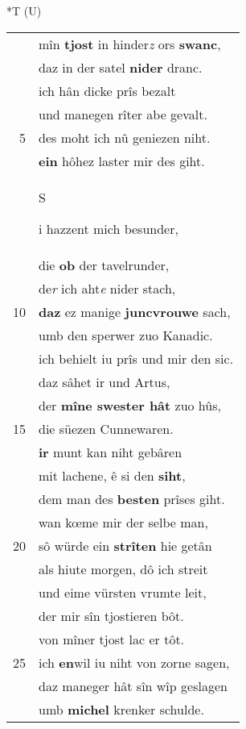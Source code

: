 \documentclass[8pt,a4paper,notitlepage]{article}
\begin{document}
\begin{table}[ht]
\begin{minipage}[t]{0.5\linewidth}
\end{minipage}
\hspace{0.5cm}
\begin{minipage}[t]{0.5\linewidth}
\small
\begin{center}*T (U)
\end{center}
\begin{tabular}{rl}
 & mîn \textbf{tjost} in hinder\textit{z} ors \textbf{swanc},\\ 
 & daz in der satel \textbf{nider} dranc.\\ 
 & ich hân dicke prîs bezalt\\ 
 & und manegen rîter abe gevalt.\\ 
5 & des moht ich nû geniezen niht.\\ 
 & \textbf{ein} hôhez laster mir des giht.\\ 
 & \begin{large}S\end{large}i hazzent mich besunder,\\ 
 & die \textbf{ob} der tavelrunder,\\ 
 & de\textit{r} ich aht\textit{e} nider stach,\\ 
10 & \textbf{daz} ez manige \textbf{juncvrouwe} sach,\\ 
 & umb den sperwer zuo Kanadic.\\ 
 & ich behielt iu prîs und mir den sic.\\ 
 & daz sâhet ir und Artus,\\ 
 & der \textbf{mîne swester hât} zuo hûs,\\ 
15 & die süezen Cunnewaren.\\ 
 & \textbf{ir} munt kan niht gebâren\\ 
 & mit lachene, ê si den \textbf{siht},\\ 
 & dem man des \textbf{besten} prîses giht.\\ 
 & wan kœme mir der selbe man,\\ 
20 & sô würde ein \textbf{strîten} hie getân\\ 
 & als hiute morgen, dô ich streit\\ 
 & und eime vürsten vrumte leit,\\ 
 & der mir sîn tjostieren bôt.\\ 
 & von mîner tjost lac er tôt.\\ 
25 & ich \textbf{en}wil iu niht von zorne sagen,\\ 
 & daz maneger hât sîn wîp geslagen\\ 
 & umb \textbf{michel} krenker schulde.\\ 

\end{tabular}
\end{minipage}
\end{table}
\end{document}
